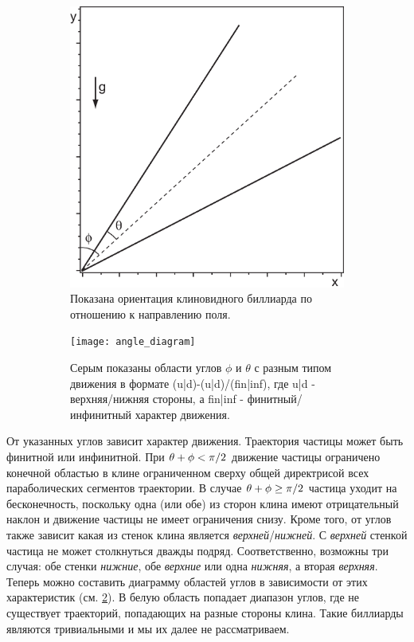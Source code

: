 \documentclass[a4paper]{article}
\begin{document}
\begin{figure}[h!]
  \centering
  \begin{subfigure}[b]{0.3\linewidth}
    \includegraphics[width=\linewidth]{in1}
    \caption{Показана ориентация клиновидного биллиарда по отношению к направлению поля.}
    \label{fig:in1}
  \end{subfigure}
  \quad\quad\quad\quad
  \begin{subfigure}[b]{0.35\linewidth}
    \texttt{[image: angle\_diagram]}
    \caption{Серым показаны области углов $\phi$ и $\theta$  с разным типом движения в формате (u|d)-(u|d)/(fin|inf), где u|d - верхняя/нижняя стороны, а fin|inf - финитный/инфинитный характер движения.}
    \label{fig:angle_diagram}
  \end{subfigure}
  \caption{ }
  \label{fig:wedge}
\end{figure}

От указанных углов зависит характер движения. Траектория частицы может быть финитной или инфинитной. При $\theta+\phi<\pi /{\rm 2}$ движение частицы ограничено конечной областью в клине ограниченном сверху общей директрисой всех параболических сегментов траектории. В случае $\theta +\phi \ge \pi /{\rm 2}$ частица уходит на бесконечность, поскольку одна (или обе) из сторон клина имеют отрицательный наклон и движение частицы не имеет ограничения снизу. Кроме того, от углов также зависит какая из стенок клина является \textit{верхней}/\textit{нижней}. С \textit{верхней} стенкой частица не может столкнуться дважды подряд.  Соответственно, возможны три случая: обе стенки \textit{нижние}, обе \textit{верхние} или одна \textit{нижняя}, а вторая \textit{верхняя}. Теперь можно составить диаграмму областей углов в зависимости от этих характеристик (см. \ref{fig:angle_diagram}). В белую область попадает диапазон углов, где не существует траекторий, попадающих на разные стороны клина. Такие биллиарды являются тривиальными и мы их далее не рассматриваем.
\end{document}
